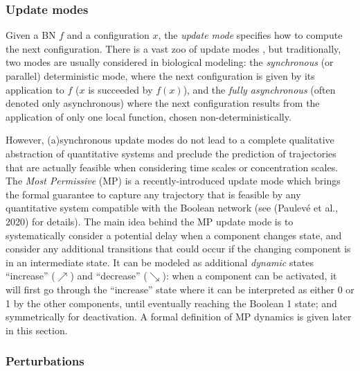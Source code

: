 \documentclass[PCJ,Unicode,screen,mode=plain]{cedram}
\begin{document}
\hypertarget{update-modes}{%
\subsubsection{Update modes}\label{update-modes}}

Given a BN \(f\) and a configuration \(x\), the \emph{update mode}
specifies how to compute the next configuration. There is a vast zoo of
update modes \citep{PS22}, but traditionally, two modes are usually
considered in biological modeling: the \emph{synchronous} (or parallel)
deterministic mode, where the next configuration is given by its
application to \(f\) (\(x\) is succeeded by \(f(x)\)), and the
\emph{fully asynchronous} (often denoted only asynchronous) where the
next configuration results from the application of only one local
function, chosen non-deterministically.

However, (a)synchronous update modes do not lead to a complete
qualitative abstraction of quantitative systems and preclude the
prediction of trajectories that are actually feasible when considering
time scales or concentration scales. The \emph{Most Permissive} (MP)
\citep{Pauleve2020,Pauleve2021} is a recently-introduced update mode
which brings the formal guarantee to capture any trajectory that is
feasible by any quantitative system compatible with the Boolean network
(see (Paulevé et al., 2020) for details). The main idea behind the MP
update mode is to systematically consider a potential delay when a
component changes state, and consider any additional transitions that
could occur if the changing component is in an intermediate state. It
can be modeled as additional \emph{dynamic} states ``increase''
(\(\nearrow\)) and ``decrease'' (\(\searrow\)): when a component can be
activated, it will first go through the ``increase'' state where it can
be interpreted as either 0 or 1 by the other components, until
eventually reaching the Boolean 1 state; and symmetrically for
deactivation. A formal definition of MP dynamics is given later in this
section.

\hypertarget{perturbations}{%
\subsubsection{Perturbations}\label{perturbations}}
\end{document}

